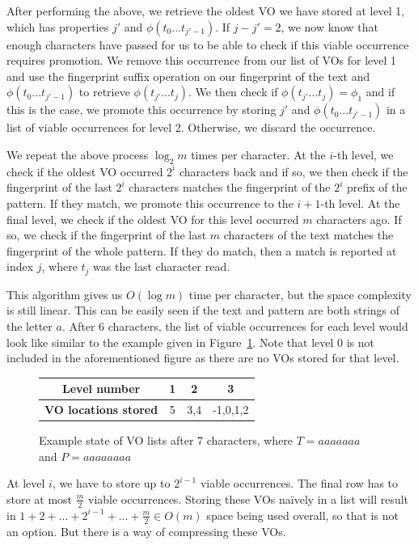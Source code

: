 \documentclass[ %
                    author={Dominic Joseph Moylett},
                    degree={MEng},
                     title={Dictionary Matching with Fingerprints},
                  subtitle={An Empirical Analysis},
                      type={Research},
                      year={2014} ]{dissertation}
\begin{document}
After performing the above, we retrieve the oldest VO we have stored at level 1, which has properties $j'$ and $\phi(t_0...t_{j'-1})$. If $j - j' = 2$, we now know that enough characters have passed for us to be able to check if this viable occurrence requires promotion. We remove this occurrence from our list of VOs for level 1 and use the fingerprint suffix operation on our fingerprint of the text and $\phi(t_0...t_{j'-1})$ to retrieve $\phi(t_{j'}...t_j)$. We then check if $\phi(t_{j'}...t_j) = \phi_1$ and if this is the case, we promote this occurrence by storing $j'$ and $\phi(t_0...t_{j'-1})$ in a list of viable occurrences for level 2. Otherwise, we discard the occurrence.

We repeat the above process $\log_2m$ times per character. At the $i$-th level, we check if the oldest VO occurred $2^i$ characters back and if so, we then check if the fingerprint of the last $2^i$ characters matches the fingerprint of the $2^i$ prefix of the pattern. If they match, we promote this occurrence to the $i+1$-th level. At the final level, we check if the oldest VO for this level occurred $m$ characters ago. If so, we check if the fingerprint of the last $m$ characters of the text matches the fingerprint of the whole pattern. If they do match, then a match is reported at index $j$, where $t_j$ was the last character read.

This algorithm gives us $O(\log m)$ time per character, but the space complexity is still linear. This can be easily seen if the text and pattern are both strings of the letter $a$. After 6 characters, the list of viable occurrences for each level would look like similar to the example given in Figure~\ref{fig:pp-vos}. Note that level 0 is not included in the aforementioned figure as there are no VOs stored for that level.

\begin{figure}[t]
\centering
\begin{tabular}{|c|c|c|c|}
  \hline
  \textbf{Level number} & 1 & 2 & 3 \\
  \hline
  \textbf{VO locations stored} & 5 & 3,4 & -1,0,1,2 \\
  \hline
\end{tabular}
\caption{Example state of VO lists after 7 characters, where $T = aaaaaaa$ and $P = aaaaaaaa$}
\label{fig:pp-vos}
\end{figure}

At level $i$, we have to store up to $2^{i - 1}$ viable occurrences. The final row has to store at most $\frac{m}{2}$ viable occurrences. Storing these VOs na\"{i}vely in a list will result in $1 + 2 + ... + 2^{i - 1} + ... + \frac{m}{2} \in O(m)$ space being used overall, so that is not an option. But there is a way of compressing these VOs.
\end{document}
